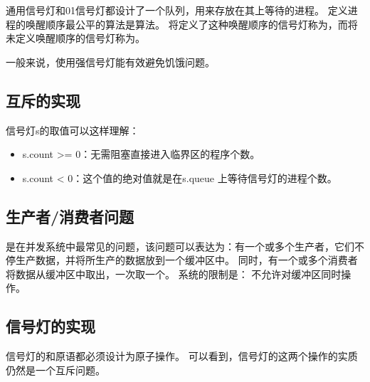 {    通用信号灯和01信号灯都设计了一个队列，用来存放在其上等待的进程。
    定义进程的唤醒顺序最公平的算法是算法。
    将定义了这种唤醒顺序的信号灯称为，而将未定义唤醒顺序的信号灯称为。

    一般来说，使用强信号灯能有效避免饥饿问题。

    \subsection{互斥的实现}
    {
        信号灯s的取值可以这样理解：

        \begin{itemize}
            \item s.count >= 0：无需阻塞直接进入临界区的程序个数。
            \item s.count < 0：这个值的绝对值就是在s.queue 上等待信号灯的进程个数。
        \end{itemize}
    }

    \subsection{生产者/消费者问题}
    {
        是在并发系统中最常见的问题，该问题可以表达为：有一个或多个生产者，它们不停生产数据，并将所生产的数据放到一个缓冲区中。
        同时，有一个或多个消费者将数据从缓冲区中取出，一次取一个。
        系统的限制是：
        不允许对缓冲区同时操作。
    }

    \subsection{信号灯的实现}
    {
        信号灯的和原语都必须设计为原子操作。
        可以看到，信号灯的这两个操作的实质仍然是一个互斥问题。
    }
}
